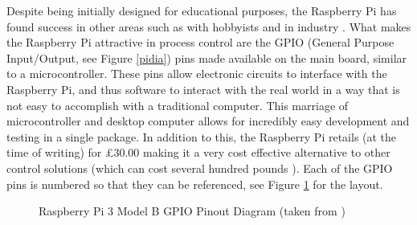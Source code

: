 \documentclass[a4]{report}
\begin{document}
	Despite being initially designed for educational purposes, the Raspberry Pi has found success in other areas such as with hobbyists \cite{pihobbynotedu} and in industry \cite{pimorethanedu}. What makes the Raspberry Pi attractive in process control are the GPIO (General Purpose Input/Output, see Figure \ref{pidia}) pins made available on the main board, similar to a microcontroller. These pins allow electronic circuits to interface with the Raspberry Pi, and thus software to interact with the real world in a way that is not easy to accomplish with a traditional computer. This marriage of microcontroller and desktop computer allows for incredibly easy development and testing in a single package. In addition to this, the Raspberry Pi retails (at the time of writing) for \pounds 30.00 \cite{picost} making it a very cost effective alternative to other control solutions (which can cost several hundred pounds \cite{otherpcucost}). Each of the GPIO pins is numbered so that they can be referenced, see Figure \ref{gpiopinout} for the layout.\newline
	\begin{figure}[!h]
	\centering
	\caption{Raspberry Pi 3 Model B GPIO Pinout Diagram (taken from  \cite{pigpiopinout})}
	\label{gpiopinout}
	\end{figure} \newline  \noindent
\end{document}
